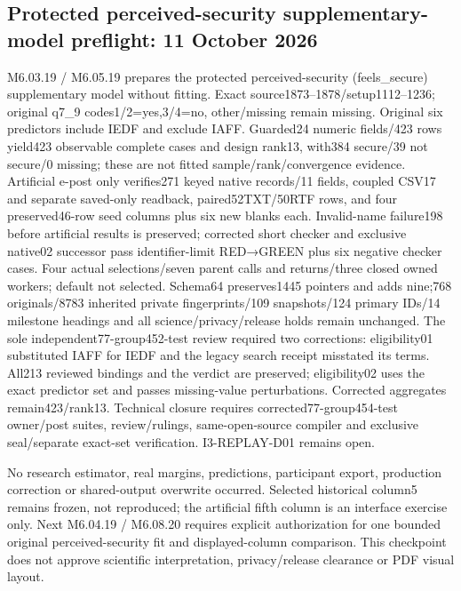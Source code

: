 \documentclass[11pt,a4paper]{article}
\begin{document}
\subsection*{Protected perceived-security supplementary-model preflight: 11 October 2026}
M6.03.19 / M6.05.19 prepares the protected perceived-security (feels\_secure) supplementary model without fitting. Exact source1873--1878/setup1112--1236; original q7\_9 codes1/2=yes,3/4=no, other/missing remain missing. Original six predictors include IEDF and exclude IAFF. Guarded24 numeric fields/423 rows yield423 observable complete cases and design rank13, with384 secure/39 not secure/0 missing; these are not fitted sample/rank/convergence evidence. Artificial e-post only verifies271 keyed native records/11 fields, coupled CSV17 and separate saved-only readback, paired52TXT/50RTF rows, and four preserved46-row seed columns plus six new blanks each. Invalid-name failure198 before artificial results is preserved; corrected short checker and exclusive native02 successor pass identifier-limit RED→GREEN plus six negative checker cases. Four actual selections/seven parent calls and returns/three closed owned workers; default not selected. Schema64 preserves1445 pointers and adds nine;768 originals/8783 inherited private fingerprints/109 snapshots/124 primary IDs/14 milestone headings and all science/privacy/release holds remain unchanged. The sole independent77-group452-test review required two corrections: eligibility01 substituted IAFF for IEDF and the legacy search receipt misstated its terms. All213 reviewed bindings and the verdict are preserved; eligibility02 uses the exact predictor set and passes missing-value perturbations. Corrected aggregates remain423/rank13. Technical closure requires corrected77-group454-test owner/post suites, review/rulings, same-open-source compiler and exclusive seal/separate exact-set verification. I3-REPLAY-D01 remains open.

No research estimator, real margins, predictions, participant export, production correction or shared-output overwrite occurred. Selected historical column5 remains frozen, not reproduced; the artificial fifth column is an interface exercise only. Next M6.04.19 / M6.08.20 requires explicit authorization for one bounded original perceived-security fit and displayed-column comparison. This checkpoint does not approve scientific interpretation, privacy/release clearance or PDF visual layout.
\end{document}
